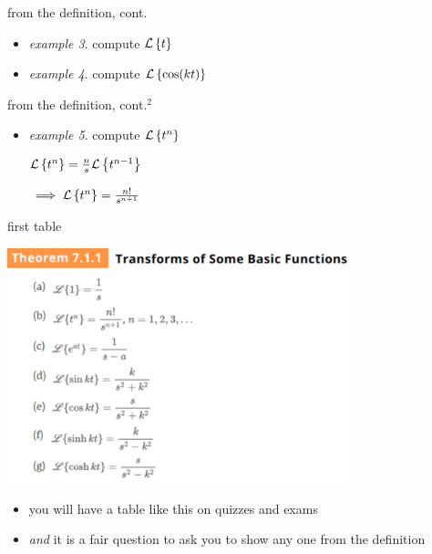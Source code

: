 \documentclass[urlcolor=blue,dvipsnames]{beamer}
\begin{document}
\begin{frame}{from the definition, cont.}

\begin{itemize}
\item \emph{example 3}.  compute $\mathcal{L}\left\{t\right\}$

\vspace{30mm}
\item \emph{example 4}.  compute $\mathcal{L}\left\{\cos(kt)\right\}$

\vspace{35mm}
\end{itemize}
\end{frame}


\begin{frame}{from the definition, cont.$^2$}

\begin{itemize}
\item \emph{example 5}.  compute $\mathcal{L}\left\{t^n\right\}$

\vspace{50mm}
\hfill $\begin{matrix}
        \mathcal{L}\left\{t^n\right\} = \frac{n}{s} \mathcal{L}\left\{t^{n-1}\right\} \\ \\
        \implies \mathcal{L}\left\{t^n\right\} = \frac{n!}{s^{n+1}}
        \end{matrix}$
\end{itemize}
\end{frame}


\begin{frame}{first table}

\begin{center}
\includegraphics[width=0.75\textwidth]{figs/laplacetable.pdf}
\end{center}

\vspace{-4mm}
\begin{itemize}
\item you will have a table like this on quizzes and exams
\item \emph{and} it is a fair question to ask you to show any one from the definition
\end{itemize}
\end{frame}
\end{document}
